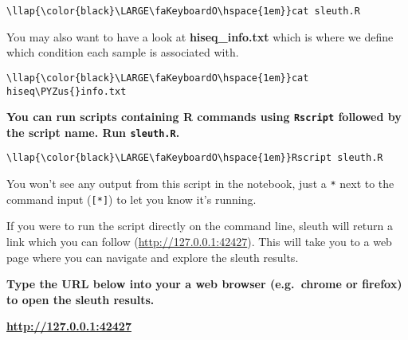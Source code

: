 \documentclass[11pt]{article}
\def\PYZus{\char`\_}
\begin{document}
\begin{terminalinput}
\begin{Verbatim}[commandchars=\\\{\}]
\llap{\color{black}\LARGE\faKeyboardO\hspace{1em}}cat sleuth.R
\end{Verbatim}
\end{terminalinput}



    You may also want to have a look at \textbf{hiseq\_info.txt} which is
where we define which condition each sample is associated with.





\begin{terminalinput}
\begin{Verbatim}[commandchars=\\\{\}]
\llap{\color{black}\LARGE\faKeyboardO\hspace{1em}}cat hiseq\PYZus{}info.txt
\end{Verbatim}
\end{terminalinput}



    \textbf{You can run scripts containing R commands using \texttt{Rscript}
followed by the script name. Run \texttt{sleuth.R}.}





\begin{terminalinput}
\begin{Verbatim}[commandchars=\\\{\}]
\llap{\color{black}\LARGE\faKeyboardO\hspace{1em}}Rscript sleuth.R
\end{Verbatim}
\end{terminalinput}



    You won't see any output from this script in the notebook, just a
\texttt{*} next to the command input (\texttt{{[}*{]}}) to let you know
it's running.

If you were to run the script directly on the command line, sleuth will
return a link which you can follow (\url{http://127.0.0.1:42427}). This
will take you to a web page where you can navigate and explore the
sleuth results.

\textbf{Type the URL below into your a web browser (e.g.~chrome or
firefox) to open the sleuth results.}

\href{http://127.0.0.1:42427}{\textbf{http://127.0.0.1:42427}}
\end{document}
